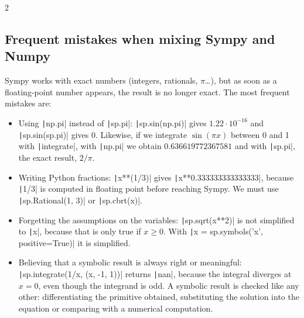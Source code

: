 \begin{paracol}{2}
\subsection{Frequent mistakes when mixing Sympy and Numpy}
Sympy works with exact numbers (integers, rationals, $\pi$\ldots), but as soon as a floating-point number appears, the result is no longer exact. The most frequent mistakes are:
\begin{itemize}
\item Using \texttt|np.pi| instead of \texttt|sp.pi|: \texttt|sp.sin(np.pi)| gives $1.22\cdot10^{-16}$ and \texttt|sp.sin(sp.pi)| gives $0$. Likewise, if we integrate $\sin(\pi x)$ between 0 and 1 with \texttt|integrate|, with \texttt|np.pi| we obtain $0.636619772367581$ and with \texttt|sp.pi|, the exact result, $2/\pi$.
\item Writing Python fractions: \texttt|x**(1/3)| gives \texttt|x**0.333333333333333|, because \texttt|1/3| is computed in floating point before reaching Sympy. We must use \texttt|sp.Rational(1, 3)| or \texttt|sp.cbrt(x)|.
\item Forgetting the assumptions on the variables: \texttt|sp.sqrt(x**2)| is not simplified to \texttt|x|, because that is only true if $x\geq0$. With \texttt|x = sp.symbols('x', positive=True)| it is simplified.
\item Believing that a symbolic result is always right or meaningful: \texttt|sp.integrate(1/x, (x, -1, 1))| returns \texttt|nan|, because the integral diverges at $x=0$, even though the integrand is odd. A symbolic result is checked like any other: differentiating the primitive obtained, substituting the solution into the equation or comparing with a numerical computation.
\end{itemize}
\end{paracol}

